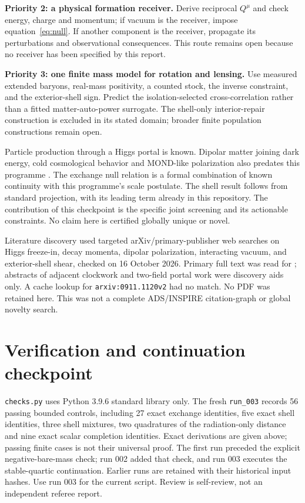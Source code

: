 \documentclass[11pt]{article}
\begin{document}
\textbf{Priority 2: a physical formation receiver.}
Derive reciprocal $Q^\mu$ and check energy, charge and momentum; if vacuum
is the receiver, impose equation~\eqref{eq:null}. If another component is
the receiver, propagate its perturbations and observational consequences.
This route remains open because no receiver has been specified by this report.

\textbf{Priority 3: one finite mass model for rotation and lensing.}
Use measured extended baryons, real-mass positivity, a counted stock,
the inverse constraint, and the exterior-shell sign. Predict the
isolation-selected cross-correlation rather than a fitted matter-auto-power
surrogate. The shell-only interior-repair construction is excluded in its
stated domain; broader finite population constructions remain open.

Particle production through a Higgs portal is known. Dipolar matter joining
dark energy, cold cosmological behavior and MOND-like polarization also
predates this programme \cite{blanchet}. The exchange null relation is a
formal combination of known continuity with this programme's scale postulate.
The shell result follows from standard projection, with its leading term
already in this repository. The contribution of this checkpoint is the
specific joint screening and its actionable constraints. No claim here is
certified globally unique or novel.

Literature discovery used targeted arXiv/primary-publisher web searches on
Higgs freeze-in, decay momenta, dipolar polarization, interacting vacuum,
and exterior-shell shear, checked on 16 October 2026. Primary full text was
read for \cite{hall,wands,blanchet}; abstracts of adjacent clockwork and
two-field portal work were discovery aids only. A cache lookup for
\texttt{arxiv:0911.1120v2} had no match. No PDF was retained here. This was
not a complete ADS/INSPIRE citation-graph or global novelty search.

\section{Verification and continuation checkpoint}
\texttt{checks.py} uses Python 3.9.6 standard library only. The fresh
\texttt{run\_003} records 56 passing bounded controls, including 27 exact
exchange identities, five exact shell identities, three shell mixtures,
two quadratures of the radiation-only distance and nine exact scalar
completion identities. Exact derivations are
given above; passing finite cases is not their universal proof.
The first run preceded the explicit negative-bare-mass check; run 002 added
that check, and run 003 executes the stable-quartic continuation. Earlier
runs are retained with their historical input hashes. Use run 003 for the
current script. Review is self-review, not an independent referee report.
\end{document}
